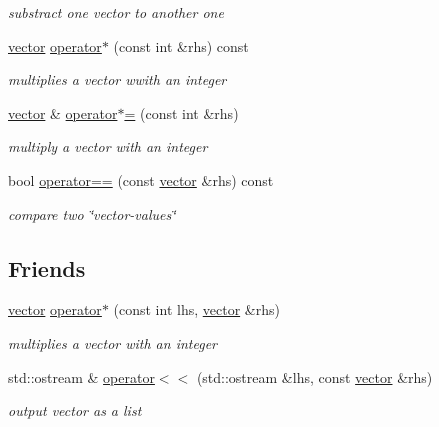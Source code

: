 \begin{DoxyCompactItemize}
\begin{DoxyCompactList}\small\item\em substract one vector to another one \end{DoxyCompactList}\item 
\hyperlink{classvector}{vector} \hyperlink{classvector_ad3885453eb4f2938c532a19729d39b66}{operator$\ast$} (const int \&rhs) const
\begin{DoxyCompactList}\small\item\em multiplies a vector wwith an integer \end{DoxyCompactList}\item 
\hyperlink{classvector}{vector} \& \hyperlink{classvector_a8bd821ebc5def1127712ff6b1c95b9ef}{operator$\ast$=} (const int \&rhs)
\begin{DoxyCompactList}\small\item\em multiply a vector with an integer \end{DoxyCompactList}\item 
bool \hyperlink{classvector_a0066b879f704f7d344ec9cd2a2f57ea3}{operator==} (const \hyperlink{classvector}{vector} \&rhs) const
\begin{DoxyCompactList}\small\item\em compare two \char`\"{}vector-\/values\char`\"{} \end{DoxyCompactList}\end{DoxyCompactItemize}
\subsection*{Friends}
\begin{DoxyCompactItemize}
\item 
\hyperlink{classvector}{vector} \hyperlink{classvector_aba6d5e4f302ff15758ed8ab4e6a7b681}{operator$\ast$} (const int lhs, \hyperlink{classvector}{vector} \&rhs)
\begin{DoxyCompactList}\small\item\em multiplies a vector with an integer \end{DoxyCompactList}\item 
std\+::ostream \& \hyperlink{classvector_a7a6813f75dabd6f9575f9d6f91890255}{operator$<$$<$} (std\+::ostream \&lhs, const \hyperlink{classvector}{vector} \&rhs)
\begin{DoxyCompactList}\small\item\em output vector as a list \end{DoxyCompactList}\end{DoxyCompactItemize}


